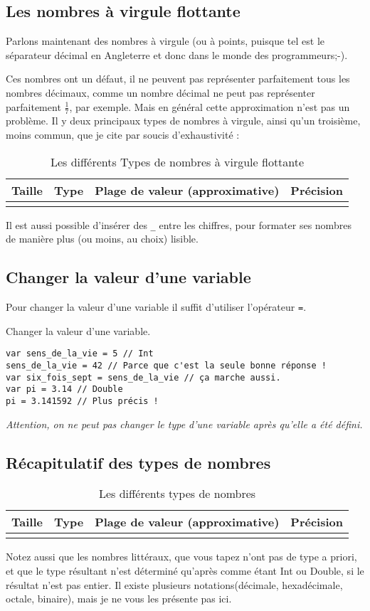 \subsection{Les nombres à virgule flottante}

Parlons maintenant des nombres à virgule (ou à points, puisque tel est le séparateur décimal en Angleterre et donc dans le monde des programmeurs;-).

Ces nombres ont un  défaut,
il ne peuvent pas représenter parfaitement tous les nombres décimaux,
comme un nombre décimal ne peut pas représenter parfaitement
\begin{math} \frac{1}{7} \end{math}, par exemple.
Mais en général cette approximation n'est pas un problème.
Il y deux principaux types de nombres à virgule, ainsi qu'un troisième,
moins commun, que je cite par soucis d'exhaustivité :
\begin{longtabu} to \linewidth {|X[3,l,m]|X[1,l,m]|X[4,r,m]|X[3,r,m]|}
\hline Taille & Type & Plage de valeur (approximative) & Précision \\ \hline
\endhead

\caption{Les différents Types de nombres à virgule flottante}
\end{longtabu}

Il est aussi possible d'insérer des \verb"_" entre les chiffres,
pour formater ses nombres de manière plus (ou moins, au choix) lisible.

\subsection{Changer la valeur d'une variable}
Pour changer la valeur d'une variable il suffit d'utiliser l'opérateur \verb"=".
\begin{listing}[h]
\caption{Changer la valeur d'une variable.}
\begin{verbatim}
var sens_de_la_vie = 5 // Int
sens_de_la_vie = 42 // Parce que c'est la seule bonne réponse !
var six_fois_sept = sens_de_la_vie // ça marche aussi.
var pi = 3.14 // Double
pi = 3.141592 // Plus précis !
\end{verbatim}
\end{listing}

\emph{Attention, on ne peut pas changer le type d'une variable après qu'elle a été défini.}
\subsection{Récapitulatif des types de nombres}
\begin{longtabu} to \linewidth {|X[3,l,m]|X[1,l,m]|X[4,r,m]|X[2,r,m]|}
\hline Taille & Type & Plage de valeur (approximative) & Précision \\ \hline
\endhead


\caption{Les différents types de nombres}
\end{longtabu}
Notez aussi que les nombres littéraux, que vous tapez n'ont pas de type a priori, et que le type résultant n'est déterminé qu'après comme étant Int ou Double, si le résultat n'est pas entier. Il existe plusieurs notations(décimale, hexadécimale, octale, binaire), mais je ne vous les présente pas ici.
